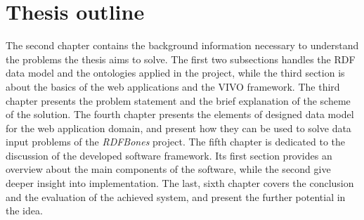 \section{Thesis outline}

The second chapter contains the background information necessary to understand the problems the thesis aims to solve. The first two subsections handles the RDF data model and the ontologies applied in the project, while the third section is about the basics of the web applications and the VIVO framework. The third chapter presents the problem statement and the brief explanation of the scheme of the solution. The fourth chapter presents the elements of designed data model for the web application domain, and present how they can be used to solve data input problems of the \textit{RDFBones} project. The fifth chapter is dedicated to the discussion of the developed software framework. Its first section provides an overview about the main components of the software, while the second give deeper insight into implementation. The last, sixth chapter covers the conclusion and the evaluation of the achieved system, and present the further potential in the idea.
